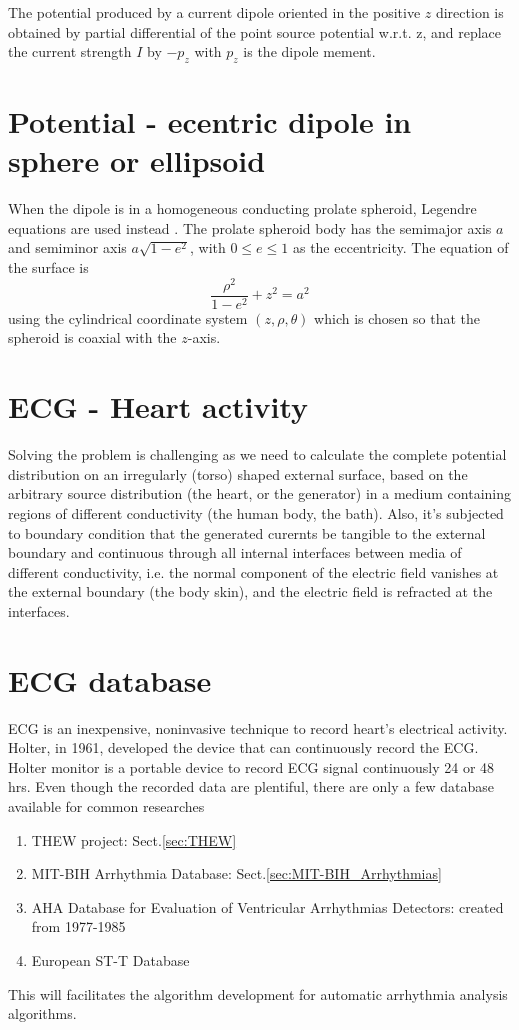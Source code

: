 The potential produced by a current dipole oriented in the positive $z$
direction is obtained by partial differential of the point source potential
w.r.t. z, and replace the current strength $I$ by $-p_z$ with $p_z$ is the
dipole mement. 


\section{Potential - ecentric dipole in sphere or ellipsoid}

When the dipole is in a homogeneous conducting prolate spheroid, Legendre
equations are used instead \citep{yeh1957}. 
The prolate spheroid body has the semimajor axis $a$ and semiminor axis
$a\sqrt{1-e^2}$, with $0\le e \le 1$ as the eccentricity. The equation of the
surface is
\begin{equation}
\frac{\rho^2}{1-e^2} + z^2 = a^2
\end{equation}
using the cylindrical coordinate system $(z,\rho,\theta)$ which is chosen so
that the spheroid is coaxial with the $z$-axis.


\section{ECG - Heart activity}

Solving the problem is challenging as we need to calculate the complete
potential distribution on an irregularly (torso) shaped external surface, based
on the arbitrary source distribution (the heart, or the generator) in a medium
containing regions of different conductivity (the human body, the bath). Also,
it's subjected to boundary condition that the generated curernts be tangible to
the external boundary and continuous through all internal interfaces between
media of different conductivity, i.e. the normal component of the electric field
vanishes at the external boundary (the body skin), and the electric field is
refracted at the interfaces.


\section{ECG database}

ECG is an inexpensive, noninvasive technique to record heart's electrical
activity. Holter, in 1961, developed the device that can continuously record
the ECG. Holter monitor is a portable device to record ECG signal continuously
24 or 48 hrs.  Even though the recorded data are plentiful, there are only a few
database available for common researches
\begin{enumerate}
  \item THEW project: Sect.\ref{sec:THEW}
  
  \item MIT-BIH Arrhythmia Database: Sect.\ref{sec:MIT-BIH_Arrhythmias}
  \item  AHA Database for Evaluation of Ventricular Arrhythmias Detectors:
  created from 1977-1985
  \item European ST-T Database
\end{enumerate}
This will facilitates the algorithm development for automatic arrhythmia
analysis algorithms.


